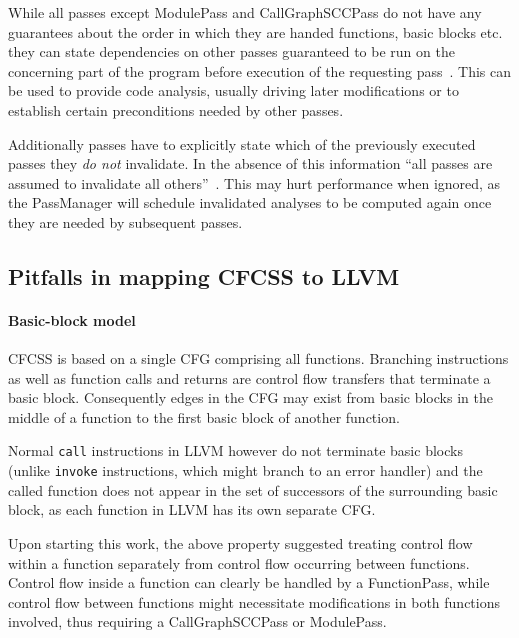 While all passes except ModulePass and
CallGraphSCCPass do not have any guarantees about the order in which they are
handed functions, basic blocks etc. they can state dependencies on other passes
guaranteed to be run on the concerning part of the program before execution of
the requesting pass~\cite[Specifying interactions between
passes]{writing-passes}. This can be used to provide code analysis, usually
driving later modifications or to establish certain preconditions needed by
other passes.

Additionally passes have to explicitly state which of the previously executed
passes they \emph{do not} invalidate. In the absence of this information “all
passes are assumed to invalidate all others”~\cite[Specifying interactions
between passes]{writing-passes}. This may hurt performance when ignored, as the
PassManager will schedule invalidated analyses to be computed again once they
are needed by subsequent passes.


\subsection{Pitfalls in mapping CFCSS to LLVM}

\paragraph{Basic-block model}

CFCSS is based on a single CFG comprising all functions. Branching instructions
as well as function calls and returns are control flow transfers that terminate
a basic block. Consequently edges in the CFG may exist from basic blocks in the
middle of a function to the first basic block of another function.

Normal \texttt{call} instructions in LLVM however do not terminate basic
blocks~\cite{langref-terminators} (unlike \texttt{invoke} instructions, which might branch to an
error handler) and the called function does not appear in the set of successors
of the surrounding basic block, as each function in LLVM has its own separate
CFG.

 Upon starting this
work, the above property suggested treating control flow
within a function separately from control flow occurring between functions.
Control flow inside a function can clearly be handled by a FunctionPass, while
control flow between functions might necessitate modifications in both
functions involved, thus requiring a CallGraphSCCPass or ModulePass.


